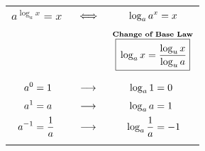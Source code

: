 \begin{multicols}{2}
\begin{CheatsheetEntryFrame}
\begin{center}
\begin{tabularx}{\textwidth}{Ccc}
            $a^{\log_a{x}} = x$
                & $\X \iff$
                & $\X \log_a{a^x} = x$
                \\

            && %
                \\ %

            {} %
                &
                & $\W \overset{\text{\textbf{Change of Base Law}}}{\boxed{\Z \log_a{x} = \frac{\log_u{x}}{\log_u{a}}}}$
                \\

            && %
                \\ %

            $\W
                        \begin{aligned}
                            \X a^0 &= 1 \\
                            \X a^1 &= a \\
                            \Y a^{-1} &= \frac{1}{a}
                        \end{aligned}
            $
                &
                    $\W
                        \begin{gathered}
                            \X \longrightarrow \\
                            \X \longrightarrow \\
                            \Y \longrightarrow
                        \end{gathered}
                    $
                &
                    $\W
                        \begin{aligned}
                            \X \log_a{1} &= 0 \\
                            \X \log_a{a} &= 1 \\
                            \Y \log_a{\frac{1}{a}} &= -1
                        \end{aligned}
                    $
                \\

            && %
                \\ %


\end{tabularx}
\end{center}
\end{CheatsheetEntryFrame}
\end{multicols}
